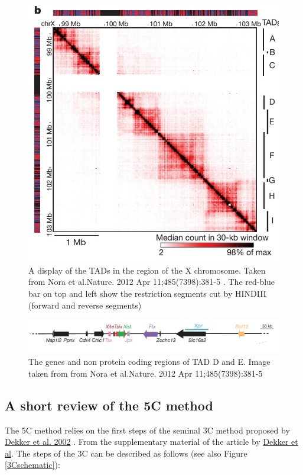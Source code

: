 \documentclass[12pt]{book}
\begin{document}
 
\begin{figure}[H]
\includegraphics*[scale=0.5]{TADsOfTheXChromosome_NoraEtAl2012}
\caption{\scriptsize{A display of the TADs in the region of the X chromosome. Taken from Nora et al.Nature. 2012 Apr 11;485(7398):381-5 \cite{nora2012spatial}. The red-blue bar on top and left show the restriction segments cut by HINDIII (forward and reverse segments)}}
\label{TADsOfTheXChromosome}
\end{figure}

\begin{figure}[H]
\includegraphics[scale=0.3]{geneSequencesTADDandE}
\caption{\scriptsize{The genes and non protein coding regions of TAD D and E. Image taken from from Nora et al.Nature. 2012 Apr 11;485(7398):381-5 \cite{nora2012spatial}}}
\label{genesOfTadDandE}
\end{figure}

\subsection{A short review of the 5C method}
The 5C method \cite{dostie2006chromosome} relies on the first steps of the seminal 3C method proposed by \href{http://www.sciencemag.org/content/295/5558/1306.full.pdf}{Dekker et al. 2002} \cite{dekker2002capturing}. 
From the supplementary material of the article by \href{http://www.sciencemag.org/content/295/5558/1306/suppl/DC1}{Dekker et al}. The steps of the 3C can be described as follows (see also Figure \ref{3Cschematic}):
\end{document}
